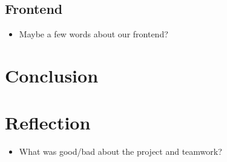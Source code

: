 \documentclass[]{report}
\begin{document}
\subsection{Frontend}
\begin{itemize}
    \item Maybe a few words about our frontend?
\end{itemize}

\section{Conclusion}

\section{Reflection}
\begin{itemize}
    \item What was good/bad about the project and teamwork?
\end{itemize}

% 
\end{document}
